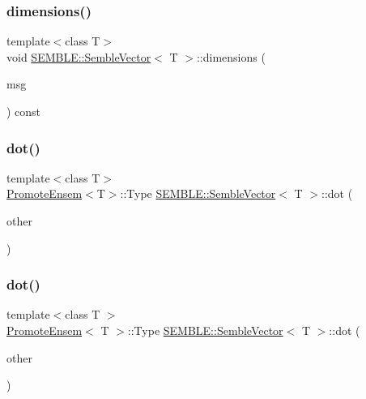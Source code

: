 \subsubsection{\texorpdfstring{dimensions()}{dimensions()}\hspace{0.1cm}{\footnotesize\ttfamily [2/2]}}
{\footnotesize\ttfamily template$<$class T$>$ \\
void \mbox{\hyperlink{structSEMBLE_1_1SembleVector}{S\+E\+M\+B\+L\+E\+::\+Semble\+Vector}}$<$ T $>$\+::dimensions (\begin{DoxyParamCaption}\item[{const std\+::string \&}]{msg }\end{DoxyParamCaption}) const\hspace{0.3cm}{\ttfamily [inline]}}

\mbox{\label{structSEMBLE_1_1SembleVector_aae6152e55a7c8ed24890ffee09b7b075}} 
\subsubsection{\texorpdfstring{dot()}{dot()}\hspace{0.1cm}{\footnotesize\ttfamily [1/2]}}
{\footnotesize\ttfamily template$<$class T$>$ \\
\mbox{\hyperlink{structSEMBLE_1_1PromoteEnsem}{Promote\+Ensem}}$<$T$>$\+::Type \mbox{\hyperlink{structSEMBLE_1_1SembleVector}{S\+E\+M\+B\+L\+E\+::\+Semble\+Vector}}$<$ T $>$\+::dot (\begin{DoxyParamCaption}\item[{const \mbox{\hyperlink{structSEMBLE_1_1SembleVector}{Semble\+Vector}}$<$ T $>$ \&}]{other }\end{DoxyParamCaption})}

\mbox{\label{structSEMBLE_1_1SembleVector_a32f9480a402dc8d53c69fa1b09c03c82}} 
\subsubsection{\texorpdfstring{dot()}{dot()}\hspace{0.1cm}{\footnotesize\ttfamily [2/2]}}
{\footnotesize\ttfamily template$<$class T $>$ \\
\mbox{\hyperlink{structSEMBLE_1_1PromoteEnsem}{Promote\+Ensem}}$<$ T $>$\+::Type \mbox{\hyperlink{structSEMBLE_1_1SembleVector}{S\+E\+M\+B\+L\+E\+::\+Semble\+Vector}}$<$ T $>$\+::dot (\begin{DoxyParamCaption}\item[{const \mbox{\hyperlink{structSEMBLE_1_1SembleVector}{Semble\+Vector}}$<$ T $>$ \&}]{other }\end{DoxyParamCaption})}

